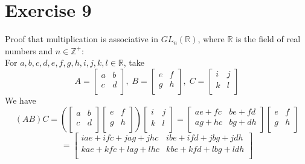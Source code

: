\documentclass{article}
\newcommand{\Z}{\mathbb{Z}}
\newcommand{\R}{\mathbb{R}}
\begin{document}
    \section*{Exercise 9}
    Proof that multiplication is associative in $GL_n(\R)$,
    where $\R$ is the field of real numbers and $n \in \Z^+$: \\
    For $a, b, c, d, e, f, g, h, i, j, k, l \in \R$, take
    \[ A =
    \begin{bmatrix}
    a & b \\
    c & d \\
    \end{bmatrix}, \;
    B =
    \begin{bmatrix}
    e & f \\
    g & h \\
    \end{bmatrix}, \;
    C =
    \begin{bmatrix}
    i & j \\
    k & l \\
    \end{bmatrix} \]
    We have
    \[ (AB)C =
    \left( \begin{bmatrix}
    a & b \\
    c & d \\
    \end{bmatrix}
    \begin{bmatrix}
    e & f \\
    g & h \\
    \end{bmatrix} \right)
    \begin{bmatrix}
    i & j \\
    k & l \\
    \end{bmatrix} 
    = \begin{bmatrix}
    ae + fc & be + fd \\
    ag + hc & bg + dh \\
    \end{bmatrix}
    \begin{bmatrix}
    e & f \\
    g & h \\
    \end{bmatrix} \]
    \[ = \begin{bmatrix}
    iae + ifc + jag + jhc & ibe + ifd + jbg + jdh \\
    kae + kfc + lag + lhc & kbe + kfd + lbg + ldh \\
    \end{bmatrix} \]
\end{document}
